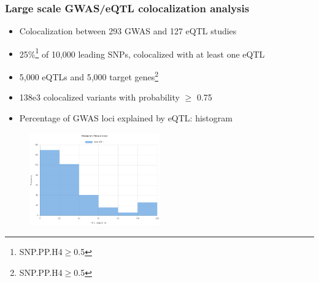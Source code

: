 \documentclass{beamer}
\begin{document}
    \begin{frame}
        \frametitle{Large scale GWAS/eQTL colocalization analysis}


        \begin{itemize}
            \item Colocalization between 293 GWAS and 127 eQTL studies
            \item 25\%\footnote{SNP.PP.H4$\geq$0.5} of 10,000 leading SNPs, colocalized with at least one eQTL
            \item 5,000 eQTLs and 5,000 target genes\footnote{SNP.PP.H4$\geq$0.5}
            \item 138e3 colocalized variants with probability $\geq$ 0.75
            \item Percentage of GWAS loci explained by eQTL: histogram
        \end{itemize}

        \begin{figure}[!]
            \includegraphics[width=0.5\textwidth]{fig/histogram_explained.png}\label{fig:perc_explained}
        \end{figure}

    \end{frame}
\end{document}
